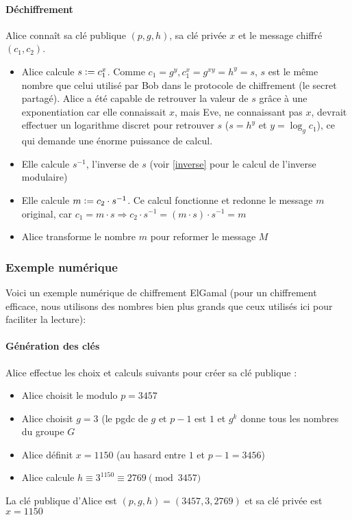 \documentclass[10pt,a4paper,twoside]{article}
\newcommand{\defeq}{\vcentcolon=}
\numberwithin{equation}{section}
\begin{document}
			\paragraph{Déchiffrement}
				Alice connaît sa clé publique $(p,g,h)$, sa clé privée $x$ et le message chiffré $(c_1,c_2)$.
				\begin{itemize}
					\item Alice calcule $s \defeq c^{x}_{1}$. Comme $c_1 = g^y, c^x_1 = g^{xy} = h^y = s$, $s$ est le même nombre que celui utilisé par Bob dans le protocole de chiffrement (le secret partagé). Alice a été capable de retrouver la valeur de $s$ grâce à une exponentiation car elle connaissait $x$, mais Eve, ne connaissant pas $x$, devrait effectuer un logarithme discret pour retrouver $s$ ($s = h^y$ et $y = \log_g c_1$), ce qui demande une énorme puissance de calcul.
					\item Elle calcule $s^{-1}$, l'inverse de $s$ (voir \autoref{inverse} pour le calcul de l'inverse modulaire)  
					\item Elle calcule $m \defeq c_2 \cdot s^{-1}$. Ce calcul fonctionne et redonne le message $m$ original, car $c_1 = m \cdot s \Rightarrow c_2 \cdot s^{-1} = (m \cdot s) \cdot s^{-1} = m$
					\item Alice transforme le nombre $m$ pour reformer le message $M$
				\end{itemize}
				
		\subsubsection{Exemple numérique}
			Voici un exemple numérique de chiffrement ElGamal (pour un chiffrement efficace, nous utilisons des nombres bien plus grands que ceux utilisés ici pour faciliter la lecture):
			
			\paragraph{Génération des clés}
				Alice effectue les choix et calculs suivants pour créer sa clé publique :
				\begin{itemize}
					\item Alice choisit le modulo $p = 3457$
					\item Alice choisit $g = 3$ (le pgdc de $g$ et $p-1$ est $1$ et $g^k$ donne tous les nombres du groupe $G$
					\item Alice définit $x = 1150$ (au hasard entre $1$ et $p-1 = 3456$)
					\item Alice calcule $h \equiv 3^{1150} \equiv 2769 \pmod{3457}$
				\end{itemize}
				La clé publique d'Alice est $(p,g,h) = (3457,3,2769)$ et sa clé privée est $x = 1150$
				
\end{document}
